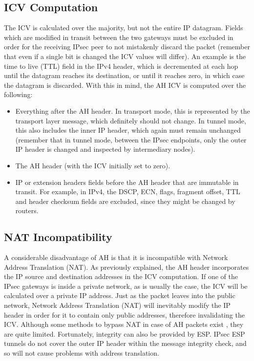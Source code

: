 \documentclass[a4paper,12pt]{report}
\begin{document}
		\subsection{ICV Computation}
		The ICV is calculated over the majority, but not the entire IP datagram. Fields which are modified in transit between the two gateways must be excluded in order for the receiving IPsec peer to not mistakenly discard the packet (remember that even if a single bit is changed the ICV values will differ). An example is the time to live (TTL) field in the IPv4 header, which is decremented at each hop until the datagram reaches its destination, or until it reaches zero, in which case the datagram is discarded. With this in mind, the AH ICV is computed over the following:
		\begin{itemize}
			\item Everything after the AH header. In transport mode, this is represented by the transport layer message, which definitely should not change. In tunnel mode, this also includes the inner IP header, which again must remain unchanged (remember that in tunnel mode, between the IPsec endpoints, only the outer IP header is changed and inspected by intermediary nodes).
			\item The AH header (with the ICV initially set to zero).
			\item IP or extension headers fields before the AH header that are immutable in transit. For example, in IPv4, the DSCP, ECN, flags, fragment offset, TTL and header checksum fields are excluded, since they might be changed by routers.
		\end{itemize}
	
		\subsection{NAT Incompatibility}
			A considerable disadvantage of AH is that it is incompatible with Network Address Translation (NAT). As previously explained, the AH header incorporates the IP source and destination addresses in the ICV computation. If one of the IPsec gateways is inside a private network, as is usually the case, the ICV will be calculated over a private IP address. Just as the packet leaves into the public network, Network Address Translation (NAT) will inevitably modify the IP header in order for it to contain only public addresses, therefore invalidating the ICV. Although some methods to bypass NAT in case of AH packets exist \cite{rfc3715}, they are quite limited. Fortunately, integrity can also be provided by ESP. IPsec ESP tunnels do not cover the outer IP header within the message integrity check, and so will not cause problems with address translation.
			
\end{document}
